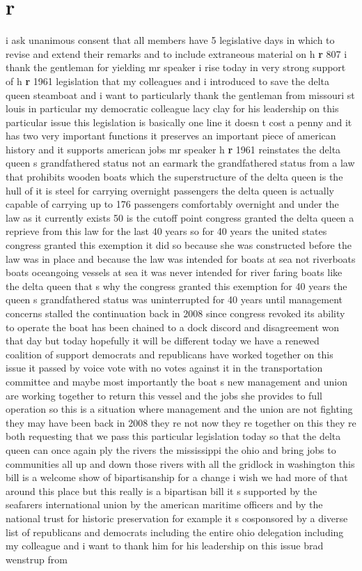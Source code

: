 \documentclass{article}
\begin{document}
\section*{r}
i ask unanimous consent that all members have 5 legislative days in which to revise and extend their remarks and to include extraneous material on h {\bf \color{red} r} 807
\vspace{8mm}
i thank the gentleman for yielding mr speaker i rise today in very strong support of h {\bf \color{red} r} 1961 legislation that my colleagues and i introduced to save the delta queen steamboat and i want to particularly thank the gentleman from missouri st louis in particular my democratic colleague lacy clay for his leadership on this particular issue this legislation is basically one line it doesn t cost a penny and it has two very important functions it preserves an important piece of american history and it supports american jobs mr speaker h {\bf \color{red} r} 1961 reinstates the delta queen s grandfathered status not an earmark the grandfathered status from a law that prohibits wooden boats which the superstructure of the delta queen is the hull of it is steel for carrying overnight passengers the delta queen is actually capable of carrying up to 176 passengers comfortably overnight and under the law as it currently exists 50 is the cutoff point congress granted the delta queen a reprieve from this law for the last 40 years so for 40 years the united states congress granted this exemption it did so because she was constructed before the law was in place and because the law was intended for boats at sea not riverboats boats oceangoing vessels at sea it was never intended for river faring boats like the delta queen that s why the congress granted this exemption for 40 years the queen s grandfathered status was uninterrupted for 40 years until management concerns stalled the continuation back in 2008 since congress revoked its ability to operate the boat has been chained to a dock discord and disagreement won that day but today hopefully it will be different today we have a renewed coalition of support democrats and republicans have worked together on this issue it passed by voice vote with no votes against it in the transportation committee and maybe most importantly the boat s new management and union are working together to return this vessel and the jobs she provides to full operation so this is a situation where management and the union are not fighting they may have been back in 2008 they re not now they re together on this they re both requesting that we pass this particular legislation today so that the delta queen can once again ply the rivers the mississippi the ohio and bring jobs to communities all up and down those rivers with all the gridlock in washington this bill is a welcome show of bipartisanship for a change i wish we had more of that around this place but this really is a bipartisan bill it s supported by the seafarers international union by the american maritime officers and by the national trust for historic preservation for example it s cosponsored by a diverse list of republicans and democrats including the entire ohio delegation including my colleague and i want to thank him for his leadership on this issue brad wenstrup from 
\end{document}
